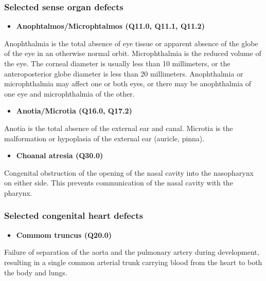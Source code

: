 \documentclass[
]{krantz}
\providecommand{\tightlist}{%
  \setlength{\itemsep}{0pt}\setlength{\parskip}{0pt}}
\begin{document}
\hypertarget{section2113}{%
\subsubsection{Selected sense organ defects}\label{section2113}}

\begin{itemize}
\tightlist
\item
  \textbf{Anophtalmos/Microphtalmos (Q11.0, Q11.1, Q11.2)}
\end{itemize}

Anophthalmia is the total absence of eye tissue or apparent absence of the globe of the eye in an otherwise normal orbit. Microphthalmia is the reduced volume of the eye. The corneal diameter is usually less than 10 millimeters, or the anteroposterior globe diameter is less than 20 millimeters. Anophthalmia or microphthalmia may affect one or both eyes, or there may be anophthalmia of one eye and microphthalmia of the other.

\begin{itemize}
\tightlist
\item
  \textbf{Anotia/Microtia (Q16.0, Q17.2)}
\end{itemize}

Anotia is the total absence of the external ear and canal. Microtia is the malformation or hypoplasia of the external ear (auricle, pinna).

\begin{itemize}
\tightlist
\item
  \textbf{Choanal atresia (Q30.0)}
\end{itemize}

Congenital obstruction of the opening of the nasal cavity into the nasopharynx on either side. This prevents communication of the nasal cavity with the pharynx.

\hypertarget{section2114}{%
\subsubsection{Selected congenital heart defects}\label{section2114}}

\begin{itemize}
\tightlist
\item
  \textbf{Commom truncus (Q20.0)}
\end{itemize}

Failure of separation of the aorta and the pulmonary artery during development, resulting in a single common arterial trunk carrying blood from the heart to both the body and lungs.
\end{document}
